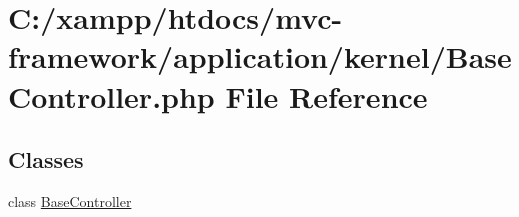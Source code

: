 \hypertarget{_base_controller_8php}{}\section{C\+:/xampp/htdocs/mvc-\/framework/application/kernel/\+Base\+Controller.php File Reference}
\label{_base_controller_8php}
\subsection*{Classes}
\begin{DoxyCompactItemize}
\item 
class \hyperlink{class_base_controller}{Base\+Controller}
\end{DoxyCompactItemize}
